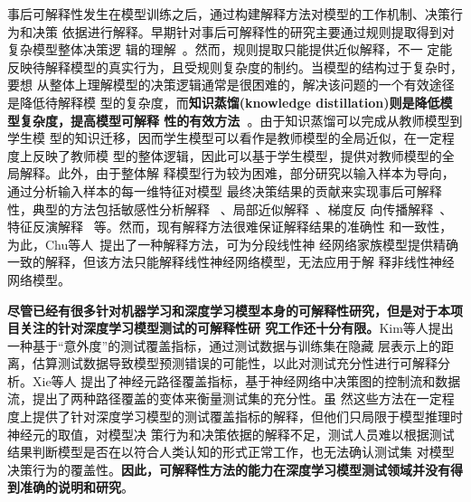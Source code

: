 事后可解释性发生在模型训练之后，通过构建解释方法对模型的工作机制、决策行为和决策
依据进行解释。早期针对事后可解释性的研究主要通过规则提取得到对复杂模型整体决策逻
辑的理解~。然而，规则提取只能提供近似解释，不一
定能反映待解释模型的真实行为，且受规则复杂度的制约。当模型的结构过于复杂时，要想
从整体上理解模型的决策逻辑通常是很困难的，解决该问题的一个有效途径是降低待解释模
型的复杂度，而\textbf{知识蒸馏(knowledge distillation)则是降低模型复杂度，提高模型可解释
	性的有效方法~}。{由于知识蒸馏可以完成从教师模型到学生模
型的知识迁移，因而学生模型可以看作是教师模型的全局近似，在一定程度上反映了教师模
型的整体逻辑，因此可以基于学生模型，提供对教师模型的全局解释}。此外，由于整体解
释模型行为较为困难，部分研究以输入样本为导向，通过分析输入样本的每一维特征对模型
最终决策结果的贡献来实现事后可解释性，典型的方法包括敏感性分析解释
~、局部近似解释~、梯度反
向传播解释~、特征反演解释
~等。然而，现有解释方法很难保证解释结果的准确性
和一致性，为此，Chu等人~提出了一种解释方法，可为分段线性神
经网络家族模型提供精确一致的解释，但该方法只能解释线性神经网络模型，无法应用于解
释非线性神经网络模型。

\textbf{尽管已经有很多针对机器学习和深度学习模型本身的可解释性研究，但是对于本项目关注的针对深度学习模型测试的可解释性研
	究工作还十分有限。}Kim等人提出一种基于“意外度”的测试覆盖指标，通过测试数据与训练集在隐藏
层表示上的距离，估算测试数据导致模型预测错误的可能性，以此对测试充分性进行可解释分析。Xie等人
提出了神经元路径覆盖指标，基于神经网络中决策图的控制流和数据流，提出了两种路径覆盖的变体来衡量测试集的充分性。虽
然这些方法在一定程度上提供了针对深度学习模型的测试覆盖指标的解释，但他们只局限于模型推理时神经元的取值，对模型决
策行为和决策依据的解释不足，测试人员难以根据测试结果判断模型是否在以符合人类认知的形式正常工作，也无法确认测试集
对模型决策行为的覆盖性。\textbf{因此，可解释性方法的能力在深度学习模型测试领域并没有得到准确的说明和研究}。

\iffalse
	\textbf{尽管已经有很多针对机器学习和深度学习模型本身的可解释性研究，但是对于本项
		目关注的针对深度学习系统测试方面的可解释性研究工作还十分有限。}Kim等人
	\citess{Kim2019Guiding}提出一种基于“意外度”的测试覆盖指标，通过度量测试数据与训
	练集的不同距离，评估测试集对样本输入空间的覆盖度，从而对测试目标进行一定的可解释
	性分析。Xie等人\citess{Xie2021NPC}提出了神经元路径覆盖指标，类似于传统的程序控制
	流图，首先从深度神经网络中提取决策图用来表示模型的决策逻辑，然后基于决策图的控制
	流和数据流，该方法提出了两种路径覆盖的变体来衡量测试数据在执行决策逻辑时的充分
	性。该测试方法在一定程度上反映出模型的决策逻辑，但由于模型本身缺乏可解释性，难以
	从控制流或数据流路径上辅助开发人员找到模型失效的原因，从而帮助修复模型。但是该方
	法依赖于模型推理过程中的神经元取值，缺乏对模型决策行为的解释，难以检查模型是否在
	以符合人类认知的形式正常工作。
\fi

